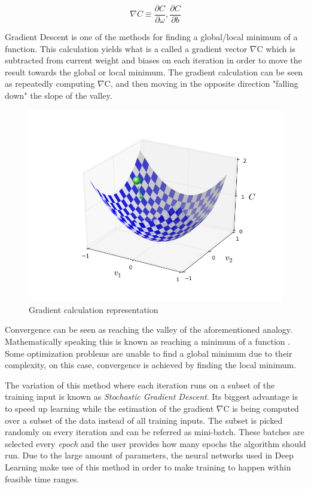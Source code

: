 \documentclass{article}
\begin{document}
$$\nabla C \equiv \frac{\partial C}{\partial \omega}, \frac{\partial C}{\partial b}$$

Gradient Descent is one of the methods for finding a global/local minimum of a function. This calculation yields what is a called a gradient vector $\nabla$C which is subtracted from current weight and biases on each iteration in order to move the result towards the global or local minimum. The gradient calculation can be seen as repeatedly computing $\nabla$C, and then moving in the opposite direction "falling down" the slope of the valley.

\begin{figure}[!ht]
\centering
	\includegraphics[scale=0.3]{valley_with_ball.png}
\caption{Gradient calculation representation \cite{nielsen2016}}
\label{fig:net_change}
\end{figure}

Convergence can be seen as reaching the valley of the aforementioned analogy. Mathematically speaking this is known as reaching a minimum of a function \cite{nielsen2016}. Some optimization problems are unable to find a global minimum due to their complexity, on this case, convergence is achieved by finding the local minimum.

The variation of this method where each iteration runs on a subset of the training input is known as \textit{Stochastic Gradient Descent}. Its biggest advantage is to speed up learning while the estimation of the gradient $\nabla$C is being computed over a subset of the data instead of all training inputs. The subset is picked randomly on every iteration and can be referred as mini-batch. These batches are selected every \textit{epoch} and the user provides how many epochs the algorithm should run. Due to the large amount of parameters, the neural networks used in Deep Learning make use of this method in order to make training to happen within feasible time ranges.
\end{document}
